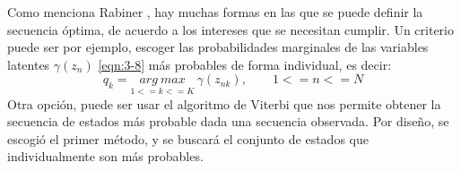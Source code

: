 Como menciona Rabiner \cite{Rabiner1989}, hay muchas formas en las que se puede definir la secuencia óptima, de acuerdo a los intereses que se necesitan cumplir. Un criterio puede ser por ejemplo, escoger las probabilidades marginales de las variables latentes $\gamma(z_n)$ \eqref{eqn:3-8} más probables de forma individual, es decir: 
\begin{equation}
q_k = \underset{1 <= k <= K}{arg~max}~ \gamma(z_{nk}), \quad \quad 1 <= n <= N
\label{eqn:3-31}
\end{equation}
Otra opción, puede ser usar el algoritmo de Viterbi que nos permite obtener la secuencia de estados más probable dada una secuencia observada. Por diseño, se escogió el primer método, y se buscará el conjunto de estados que individualmente son más probables.

